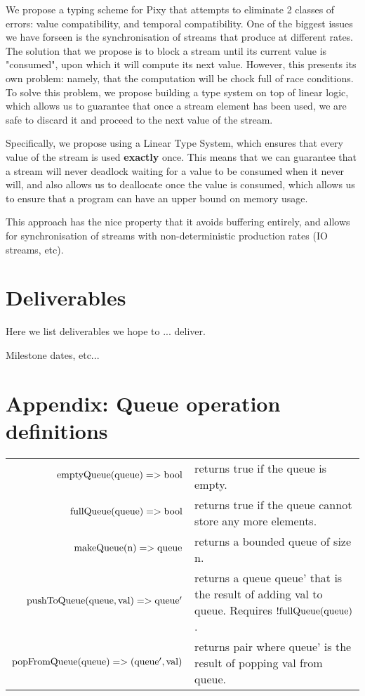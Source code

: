 \documentclass{scrartcl}
\begin{document}
    We propose a typing scheme for Pixy that attempts to eliminate 2 classes of errors: value compatibility, and 
    temporal compatibility. One of the biggest issues we have forseen is the synchronisation of streams that produce at different rates.
    The solution that we propose is to block a stream until its current value is "consumed", upon which it will compute its next value.
    However, this presents its own problem: namely, that the computation will be chock full of race conditions.
    To solve this problem, we propose building a type system on top of linear logic, which allows us to guarantee that once a stream element 
    has been used, we are safe to discard it and proceed to the next value of the stream.

    Specifically, we propose using a Linear Type System, which ensures that every value of the stream is used \textbf{exactly} once.
    This means that we can guarantee that a stream will never deadlock waiting for a value to be consumed when it never will, and also
    allows us to deallocate once the value is consumed, which allows us to ensure that a program can have an upper bound on memory usage.

    This approach has the nice property that it avoids buffering entirely, and allows for synchronisation of streams with non-deterministic production rates
    (IO streams, etc).
    
    
    
    \section{Deliverables}

    Here we list deliverables we hope to ... deliver.

    Milestone dates, etc...

    \appendix

    \section{Appendix: Queue operation definitions}
    \label{app:queueops}

    \begin{tabularx}{\textwidth}{ @{} r | Y @{} }
        $\textnormal{emptyQueue}(\textnormal{queue}) => \textnormal{bool}$ & returns true if the queue is empty. \\
        $\textnormal{fullQueue}(\textnormal{queue}) => \textnormal{bool}$ & returns true if the queue cannot store any more elements. \\
        $\textnormal{makeQueue}(\textnormal{n}) => \textnormal{queue}$ & returns a bounded queue of size n. \\
        $\textnormal{pushToQueue}(\textnormal{queue}, \textnormal{val}) => \textnormal{queue}'$ & returns a queue queue' that is the result of adding val to queue. Requires $!\textnormal{fullQueue}(\textnormal{queue})$. \\
        $\textnormal{popFromQueue}(\textnormal{queue}) => (\textnormal{queue}', \textnormal{val})$ & returns pair where queue' is the result of popping val from queue.
    \end{tabularx}
\end{document}
